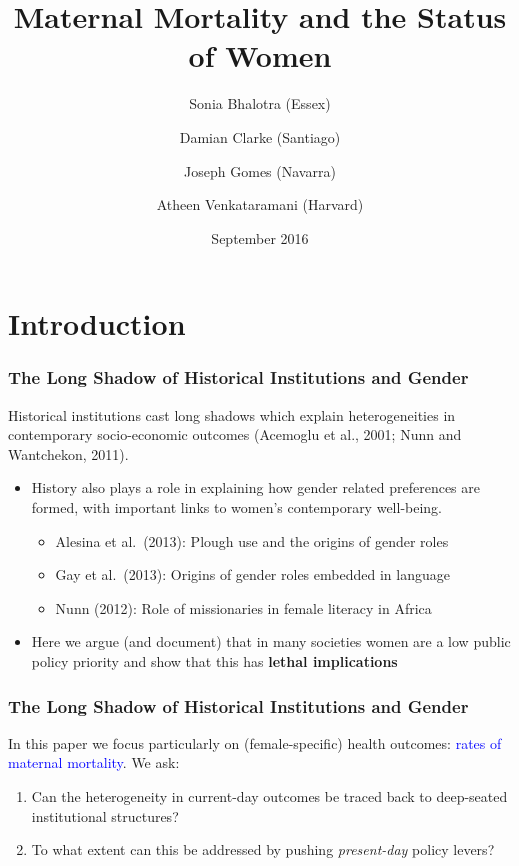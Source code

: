 \documentclass[10pt,letterpaper,subeqn]{beamer}
\title{Maternal Mortality and the Status of Women}
\author[Bhalotra et al.]{Sonia Bhalotra (Essex)
    \and Damian Clarke (Santiago) \\ \vspace{1mm}
    \and Joseph Gomes (Navarra)
    \and Atheen Venkataramani (Harvard)}
\date{September 2016}
\begin{document}
\begin{frame}
\titlepage
\end{frame}

\section{Introduction}
\begin{frame}[label=intro]
\frametitle{The Long Shadow of Historical Institutions and Gender}
Historical institutions cast long shadows which explain heterogeneities
      in contemporary socio-economic outcomes (Acemoglu et al., 2001; Nunn and
      Wantchekon, 2011). \vspace{3mm} \\
\begin{itemize}
    \setlength{\itemsep}{10pt}
	\item History also plays a role in explaining how gender related preferences
      are formed, with important links to women's contemporary well-being.
	\begin{itemize}
		\item Alesina et al.\ (2013): Plough use and the origins of gender roles 
		\item Gay et al.\ (2013): Origins of gender roles embedded in language
		\item Nunn (2012): Role of missionaries in female literacy in Africa
	\end{itemize}
  \item Here we argue (and document) that in many societies women are a low
    public policy priority and show that this has \textbf{lethal implications}
  \end{itemize}
\end{frame}

\begin{frame}
  \frametitle{The Long Shadow of Historical Institutions and Gender}
  In this paper we focus particularly on (female-specific) health outcomes:
  \textcolor{blue}{rates of maternal mortality}.  We ask: \vspace{3mm} \\
  \begin{enumerate}
  \item Can the heterogeneity in current-day outcomes be traced back to deep-seated institutional structures? 
  \item To what extent can this be addressed by pushing \emph{present-day} policy levers? 
  \end{enumerate}
\end{frame}
\end{document}
